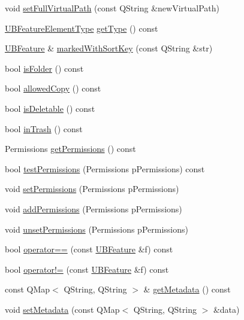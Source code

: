 \begin{DoxyCompactItemize}
void \hyperlink{class_u_b_feature_a58695954a19840ff0b9776ef949367ca}{set\-Full\-Virtual\-Path} (const Q\-String \&new\-Virtual\-Path)
\item 
\hyperlink{_u_b_features_controller_8h_a1ae525bf6101c0de35195259d4a6674f}{U\-B\-Feature\-Element\-Type} \hyperlink{class_u_b_feature_a9e48a4ed3645dd5e1aea16d73ce4feff}{get\-Type} () const 
\item 
\hyperlink{class_u_b_feature}{U\-B\-Feature} \& \hyperlink{class_u_b_feature_a06ef8947e3549b28cba869ae1c547dae}{marked\-With\-Sort\-Key} (const Q\-String \&str)
\item 
bool \hyperlink{class_u_b_feature_a4569d58d046487e2c641b775cad183d1}{is\-Folder} () const 
\item 
bool \hyperlink{class_u_b_feature_a6dffbaf521d089bc6dc8470080b3d875}{allowed\-Copy} () const 
\item 
bool \hyperlink{class_u_b_feature_a3f4024d11d7ee8a22878dc7cae1552cb}{is\-Deletable} () const 
\item 
bool \hyperlink{class_u_b_feature_a6da410ea00a0f35e4b04dfff0cf8038d}{in\-Trash} () const 
\item 
Permissions \hyperlink{class_u_b_feature_afdae8ba02969f87bb67322a609ae4f7d}{get\-Permissions} () const 
\item 
bool \hyperlink{class_u_b_feature_a0409ed3573ae447f8e56f77f7975d8b0}{test\-Permissions} (Permissions p\-Permissions) const 
\item 
void \hyperlink{class_u_b_feature_a8f3a6a2de89aff39d6ee29ca4e12e1bd}{set\-Permissions} (Permissions p\-Permissions)
\item 
void \hyperlink{class_u_b_feature_a6a49440fee4ef7274a4610d7e847b03f}{add\-Permissions} (Permissions p\-Permissions)
\item 
void \hyperlink{class_u_b_feature_a5d6d53594f156b21575e25ab1b3e3663}{unset\-Permissions} (Permissions p\-Permissions)
\item 
bool \hyperlink{class_u_b_feature_aa922055a1ae68dac4e7dc2187fd2b57f}{operator==} (const \hyperlink{class_u_b_feature}{U\-B\-Feature} \&f) const 
\item 
bool \hyperlink{class_u_b_feature_a0a70308ff6ca02ff2101c8e395f2f9a8}{operator!=} (const \hyperlink{class_u_b_feature}{U\-B\-Feature} \&f) const 
\item 
const Q\-Map$<$ Q\-String, Q\-String $>$ \& \hyperlink{class_u_b_feature_a018d19881e68bd7e936cc705009cac35}{get\-Metadata} () const 
\item 
void \hyperlink{class_u_b_feature_a98f84f776e5e06725f8b631bce07e122}{set\-Metadata} (const Q\-Map$<$ Q\-String, Q\-String $>$ \&data)
\end{DoxyCompactItemize}


